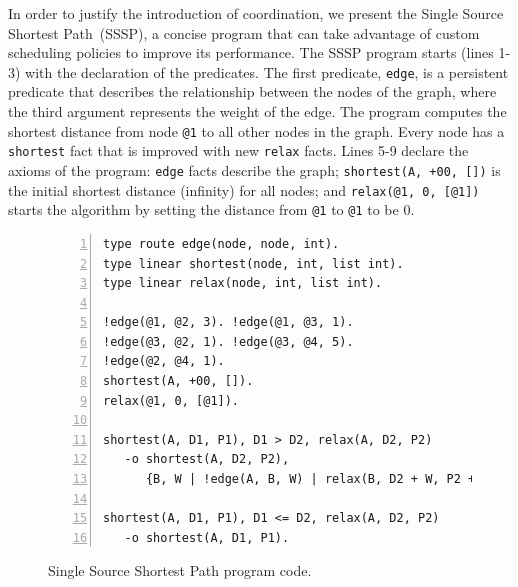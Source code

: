 In order to justify the introduction of coordination, we present the Single
Source Shortest Path~(SSSP), a concise program that can take advantage of custom
scheduling policies to improve its performance. The SSSP program starts (lines
1-3) with the declaration of the predicates. The first predicate, \texttt{edge},
is a persistent predicate that describes the relationship between the nodes of
the graph, where the third argument represents the weight of the edge.  The
program computes the shortest distance from node \texttt{@1} to all other nodes
in the graph. Every node has a \texttt{shortest} fact that is improved with new
\texttt{relax} facts.  Lines 5-9 declare the axioms of the program:
\texttt{edge} facts describe the graph; \texttt{shortest(A, +00, [])} is the
initial shortest distance (infinity) for all nodes; and \texttt{relax(@1, 0,
   [@1])} starts the algorithm by setting the distance from \texttt{@1} to
\texttt{@1} to be 0.

\begin{figure}[ht]
\begin{Verbatim}[numbers=left]
type route edge(node, node, int).
type linear shortest(node, int, list int).
type linear relax(node, int, list int).

!edge(@1, @2, 3). !edge(@1, @3, 1).
!edge(@3, @2, 1). !edge(@3, @4, 5).
!edge(@2, @4, 1).
shortest(A, +00, []).
relax(@1, 0, [@1]).

shortest(A, D1, P1), D1 > D2, relax(A, D2, P2)
   -o shortest(A, D2, P2),
      {B, W | !edge(A, B, W) | relax(B, D2 + W, P2 ++ [B])}.

shortest(A, D1, P1), D1 <= D2, relax(A, D2, P2)
   -o shortest(A, D1, P1).
\end{Verbatim}
\caption{Single Source Shortest Path program code.}
\label{code:shortest_path_program}
\end{figure}

